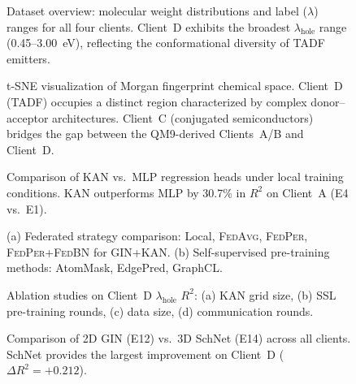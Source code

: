 \documentclass[twocolumn]{article}
\newcommand{\lam}{\lambda}
\newcommand{\lamhole}{\lambda_{\text{hole}}}
\newcommand{\Rsq}{R^{2}}
\newcommand{\FedPer}{\textsc{FedPer}}
\newcommand{\FedBN}{\textsc{FedBN}}
\newcommand{\FedAvg}{\textsc{FedAvg}}
\begin{document}
\begin{figure}[h]
\centering
\caption{Dataset overview: molecular weight distributions and label ($\lam$) ranges for all four clients.
Client~D exhibits the broadest $\lamhole$ range (0.45--3.00~eV), reflecting the conformational diversity of TADF emitters.}
\label{fig:dataset}
\end{figure}

\begin{figure}[h]
\centering
\caption{t-SNE visualization of Morgan fingerprint chemical space.
Client~D (TADF) occupies a distinct region characterized by complex donor--acceptor architectures.
Client~C (conjugated semiconductors) bridges the gap between the QM9-derived Clients~A/B and Client~D.}
\label{fig:tsne}
\end{figure}

\begin{figure}[h]
\centering
\caption{Comparison of KAN vs.\ MLP regression heads under local training conditions.
KAN outperforms MLP by 30.7\% in $\Rsq$ on Client~A (E4 vs.\ E1).}
\label{fig:kan_vs_mlp}
\end{figure}

\begin{figure}[h]
\centering
\caption{(a) Federated strategy comparison: Local, \FedAvg{}, \FedPer{}, \FedPer{}+\FedBN{} for GIN+KAN.
(b) Self-supervised pre-training methods: AtomMask, EdgePred, GraphCL.}
\label{fig:strategies}
\end{figure}

\begin{figure}[h]
\centering
\caption{Ablation studies on Client~D $\lamhole$ $\Rsq$:
(a) KAN grid size, (b) SSL pre-training rounds, (c) data size, (d) communication rounds.}
\label{fig:ablation}
\end{figure}

\begin{figure}[h]
\centering
\caption{Comparison of 2D GIN (E12) vs.\ 3D SchNet (E14) across all clients.
SchNet provides the largest improvement on Client~D ($\Delta \Rsq = +0.212$).}
\label{fig:gin_vs_schnet}
\end{figure}
\end{document}
